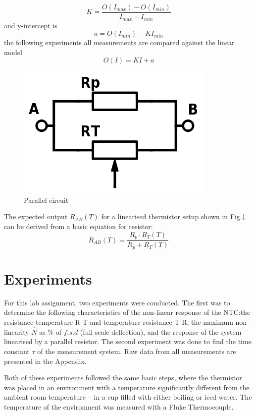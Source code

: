 \documentclass[a4,11pt]{article}
\begin{document}
$$K=\frac{O(I_{max})-O(I_{min})}{I_{max}-I_{min}}$$
and y-intercept is
\begin{equation}
  \label{eq:intercept}
  a=O(I_{min})-KI_{min}
\end{equation}
the following experiments all measurements are compared against the linear model
\begin{equation}
  O(I)=KI+a
\end{equation}
\begin{figure}[H]
  \label{fig:parallel}
  \centering
  \includegraphics[width=0.75\columnwidth]{parallel.png}
  \caption{
    Parallel circuit
  }
\end{figure}
The expected output $R_{AB}(T)$ for a linearised thermistor setup shown in Fig.\ref{fig:parallel} can be derived from a basic equation for resistor:
\begin{equation}
  \label{eq:Rab}
  R_{AB}(T)=\frac{R_p\cdot R_T(T)}{R_p+R_T(T)}
\end{equation}
\section{Experiments}
For this lab assignment, two experiments were conducted. The first was to determine the following characteristics of the non-linear response of the NTC:\@ the resistance-temperature R-T and temperature-resistance T-R, the maximum non-linearity $\hat N$ as \% of $f.s.d$ (full scale deflection), and the response of the system linearised by a parallel resistor. The second experiment was done to find the time constant $\tau$ of the measurement system. Raw data from all measurements are presented in the Appendix.

Both of these experiments followed the same basic steps, where the thermistor was placed in an environment with a temperature significantly different from the ambient room temperature -- in a cup filled with either boiling or iced water. The temperature of the environment was measured with a Fluke Thermocouple.
\end{document}
